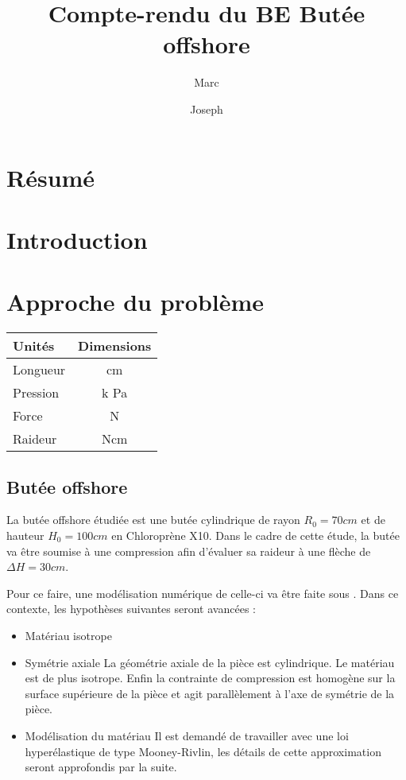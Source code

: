 ﻿\documentclass{article}
\title{Compte-rendu du BE Butée offshore}
\author{\bsc{Muller} Marc \and \bsc{Buquet} Joseph}
\newcommand{\abaqus}{\bsc{Abaqus}\xspace}
\begin{document}
\maketitle

\newpage

\section{Résumé}

\section{Introduction}




\section{Approche du problème}

\begin{table}
\centering
\begin{tabular}{|l|c|}
\hline
Unités & Dimensions \\ \hline
Longueur & cm \\
Pression & k Pa \\
Force & N \\
Raideur & N\/cm \\\hline
\end{tabular}
\end{table}

\subsection{Butée offshore}
La butée offshore étudiée est une butée cylindrique de rayon $R_0 = 70 cm$ et de hauteur $H_0 = 100 cm$ en Chloroprène X10. Dans le cadre de cette étude, la butée va être soumise à une compression afin d'évaluer sa raideur à une flèche de $\Delta H = 30 cm$.

Pour ce faire, une modélisation numérique de celle-ci va être faite sous \abaqus. Dans ce contexte, les hypothèses suivantes seront avancées :
\begin{itemize}
\item Matériau isotrope
\item Symétrie axiale
La géométrie axiale de la pièce est cylindrique. Le matériau est de plus isotrope. Enfin la contrainte de compression est homogène sur la surface supérieure de la pièce et agit parallèlement à l'axe de symétrie de la pièce.
\item Modélisation du matériau
Il est demandé de travailler avec une loi hyperélastique de type Mooney-Rivlin, les détails de cette approximation seront approfondis par la suite.
\end{itemize}
\end{document}
